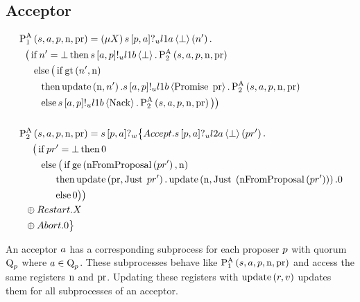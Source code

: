 \subsection{Acceptor}
\begin{align*}
&\operatorname{P^{A}_{1}}\left(s, a, p, \operatorname{n}, \operatorname{pr}\right) = \left(\mu X\right) s\left[p, a\right]?_u l1a \left\langle \bot \right\rangle \left(n'\right) .\\
&\hspace*{0.75em * 1}\big ( \operatorname{if} n' = \bot \operatorname{then} s\left[a, p\right]!_u l1b \left\langle \bot \right\rangle.\operatorname{P^{A}_{2}}\left(s, a, p, \operatorname{n}, \operatorname{pr}\right)\\
&\hspace*{0.75em * 2}\operatorname{else} \big( \operatorname{if} \operatorname{gt}\left(n', \operatorname{n}\right)\\
&\hspace*{0.75em * 3}\operatorname{then} \operatorname{update} \left(\operatorname{n}, n'\right).s\left[a, p\right]!_u l1b \left\langle \operatorname{Promise}\; \operatorname{pr} \right\rangle.\operatorname{P^{A}_{2}}\left(s, a, p, \operatorname{n}, \operatorname{pr}\right)\\
&\hspace*{0.75em * 3}\operatorname{else} s\left[a, p\right]!_u l1b \left\langle \operatorname{Nack} \right\rangle.\operatorname{P^{A}_{2}}\left(s, a, p, \operatorname{n}, \operatorname{pr}\right)
\big ) \big )
\\\\
&\operatorname{P^{A}_{2}}\left(s, a, p, \operatorname{n}, \operatorname{pr}\right) = s\left[p, a\right]?_w \big\{\mathnormal{Accept} . s\left[p, a\right]?_u l2a \left\langle \bot \right\rangle \left(pr'\right) .\\
&\hspace*{0.75em * 2}\big( \operatorname{if} pr' = \bot \operatorname{then} 0\\
&\hspace*{0.75em * 3}\operatorname{else} \big( \operatorname{if} \operatorname{ge}\left(\operatorname{nFromProposal}\left(pr' \right), \operatorname{n}\right)\\
&\hspace*{0.75em * 5}\operatorname{then} \operatorname{update} \left(\operatorname{pr}, \operatorname{Just}\; pr'\right) . \operatorname{update} \left(\operatorname{n}, \operatorname{Just}\; \left(\operatorname{nFromProposal}\left(pr' \right)\right)\right).0\\
&\hspace*{0.75em * 5}\operatorname{else} 0 \big ) \big )\\
&\hspace*{0.75em * 1} \oplus \mathnormal{Restart}.X\\
&\hspace*{0.75em * 1} \oplus \mathnormal{Abort}.0
\big\}
\end{align*}

An acceptor $a$ has a corresponding subprocess for each proposer $p$ with quorum $\operatorname{Q}_{p}$ where $a\in\operatorname{Q}_{p}$.
These subprocesses behave like $\operatorname{P^{A}_{1}}\left(
    s,
    a,
    p,
    \operatorname{n},
    \operatorname{pr}
\right)$ and access the same registers $\operatorname{n}$ and $\operatorname{pr}$.
Updating these registers with $\operatorname{update} \left(r, v\right)$ updates them for all subprocesses of an acceptor.

